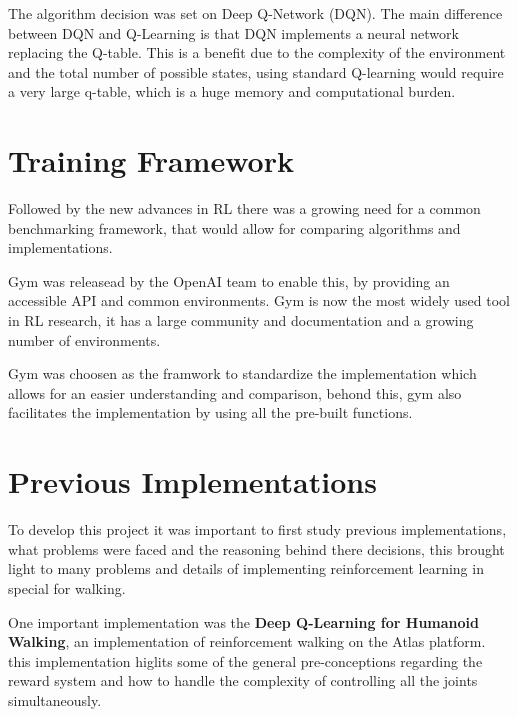 The algorithm decision was set on Deep Q-Network (DQN). The main difference between DQN and Q-Learning is that DQN implements a neural network replacing the Q-table. This is a benefit due to the complexity of the environment and the total number of possible states, using standard Q-learning would require a very large q-table, which is a huge memory and computational burden.

\section{Training Framework}
Followed by the new advances in RL there was a growing need for a common benchmarking framework, that would allow for comparing algorithms and implementations.

Gym was releasead by the OpenAI team to enable this, by providing an accessible API and common environments. Gym is now the most widely used tool in RL research, it has a large community and documentation and a growing number of environments.

Gym was choosen as the framwork to standardize the implementation which allows for an easier understanding and comparison, behond this, gym also facilitates the implementation by using all the pre-built functions.

\section{Previous Implementations}
To develop this project it was important to first study previous implementations, what problems were faced and the reasoning behind there decisions, 
this brought light to many problems and details of implementing reinforcement learning in special for walking.

One important implementation was the \textbf{Deep Q-Learning for Humanoid Walking}\cite{atlas_rl}, an implementation of reinforcement walking on the Atlas platform.
this implementation higlits some of the general pre-conceptions regarding the reward system and how to handle the complexity of controlling all the joints simultaneously.

